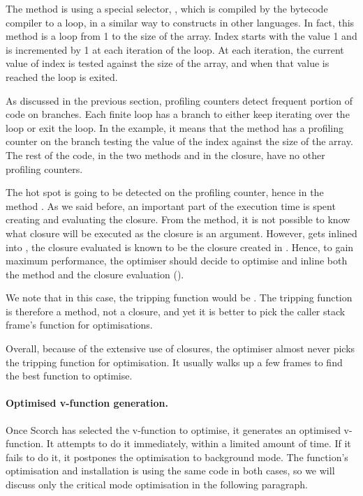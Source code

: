 \documentclass[a4paper,12pt,twoside]{../includes/ThesisStyle}
\begin{document}
The method  is using a special selector, , which is compiled by the bytecode compiler to a loop, in a similar way to  constructs in other languages. In fact, this method is a loop from 1 to the size of the array. Index starts with the value 1 and is incremented by 1 at each iteration of the loop. At each iteration, the current value of index is tested against the size of the array, and when that value is reached the loop is exited.

As discussed in the previous section, profiling counters detect frequent portion of code on branches. Each finite loop has a branch to either keep iterating over the loop or exit the loop. In the example, it means that the method  has a profiling counter on the branch testing the value of the index against the size of the array. The rest of the code, in the two methods and in the closure, have no other profiling counters.

The hot spot is going to be detected on the profiling counter, hence in the method . As we said before, an important part of the execution time is spent creating and evaluating the closure. From the  method, it is not possible to know what closure will be executed as the closure is an argument. However,   gets inlined into , the closure evaluated is known to be the closure created in  . Hence, to gain maximum performance, the optimiser should decide to optimise  and inline both the  method and the closure evaluation (). 

We note that in this case, the tripping function would be . The tripping function is therefore a method, not a closure, and yet it is better to pick the caller stack frame's function for optimisations.

Overall, because of the extensive use of closures, the optimiser almost never picks the tripping function for optimisation. It usually walks up a few frames to find the best function to optimise. 

\paragraph{Optimised v-function generation.}
Once Scorch has selected the v-function to optimise, it generates an optimised v-function. It attempts to do it immediately, within a limited amount of time. If it fails to do it, it postpones the optimisation to background mode. The function's optimisation and installation is using the same code in both cases, so we will discuss only the critical mode optimisation in the following paragraph.
\end{document}
